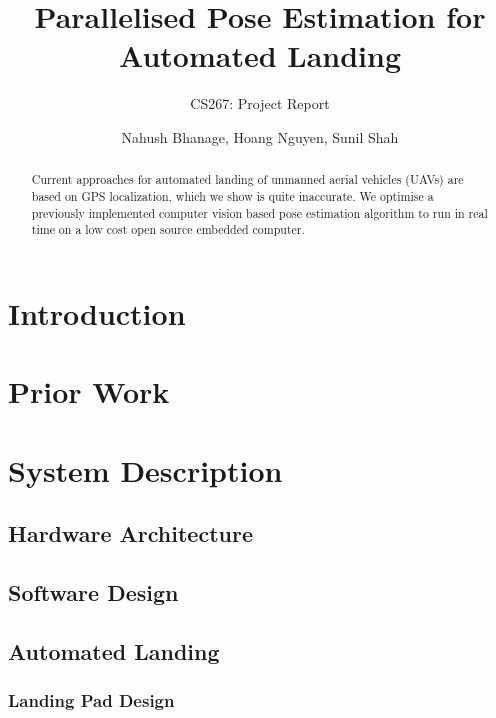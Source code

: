 \documentclass[10pt, twocolumn]{scrartcl} %
\title{Parallelised Pose Estimation for Automated Landing}
\subtitle{CS267: Project Report}
\author{Nahush Bhanage, Hoang Nguyen, Sunil Shah}
\date{}
\begin{document}
\maketitle

\begin{abstract}
Current approaches for automated landing of unmanned aerial vehicles (UAVs) are
based on GPS localization, which we show is quite inaccurate. We optimise a previously implemented computer vision based pose estimation algorithm to run in real time on a low cost open source embedded computer.
\end{abstract}

\section{Introduction}



\section{Prior Work}


\section{System Description}

\subsection{Hardware Architecture}

\subsection{Software Design}


\subsection{Automated Landing}

\subsubsection{Landing Pad Design}
\end{document}
